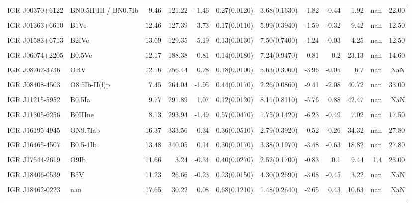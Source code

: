 \begin{longtable}{llrrrllrrrrr}
IGR J00370+6122 & BN0.5II-III / BN0.7Ib & 9.46 & 121.22 & -1.46 & 0.27(0.0120) & 3.68(0.1630) & -1.82 & -0.44 & 1.92 & nan & 22.00 \\ \\
IGR J01363+6610 & B1Ve & 12.46 & 127.39 & 3.73 & 0.17(0.0110) & 5.99(0.3940) & -1.59 & -0.32 & 9.42 & nan & 12.50 \\ \\
IGR J01583+6713 & B2IVe & 13.69 & 129.35 & 5.19 & 0.13(0.0130) & 7.50(0.7400) & -1.24 & -0.03 & 4.25 & nan & 12.50 \\ \\
IGR J06074+2205 & B0.5Ve & 12.17 & 188.38 & 0.81 & 0.14(0.0180) & 7.24(0.9470) & 0.81 & 0.2 & 23.13 & nan & 14.60 \\ \\
IGR J08262-3736 & OBV & 12.16 & 256.44 & 0.28 & 0.18(0.0100) & 5.63(0.3060) & -3.96 & -0.05 & 6.7 & nan & NaN \\ \\
IGR J08408-4503 & O8.5Ib-II(f)p & 7.45 & 264.04 & -1.95 & 0.44(0.0170) & 2.26(0.0860) & -9.41 & -2.08 & 40.72 & nan & 33.00 \\ \\
IGR J11215-5952 & B0.5Ia & 9.77 & 291.89 & 1.07 & 0.12(0.0120) & 8.11(0.8110) & -5.76 & 0.88 & 42.47 & nan & NaN \\ \\
IGR J11305-6256 & B0IIIne & 8.13 & 293.94 & -1.49 & 0.57(0.0470) & 1.75(0.1420) & -6.23 & -0.49 & 7.02 & nan & 17.50 \\ \\
IGR J16195-4945 & ON9.7Iab & 16.37 & 333.56 & 0.34 & 0.36(0.0510) & 2.79(0.3920) & -0.52 & -0.26 & 34.32 & nan & 27.80 \\ \\
IGR J16465-4507 & B0.5-1Ib & 13.48 & 340.05 & 0.14 & 0.30(0.0170) & 3.38(0.1970) & -3.48 & -0.63 & 18.82 & nan & 27.80 \\ \\
IGR J17544-2619 & O9Ib & 11.66 & 3.24 & -0.34 & 0.40(0.0270) & 2.52(0.1700) & -0.83 & 0.1 & 9.44 & 1.4 & 23.00 \\ \\
IGR J18406-0539 & B5V & 11.23 & 26.66 & -0.23 & 0.23(0.0150) & 4.30(0.2690) & -3.08 & -0.45 & 3.22 & nan & NaN \\ \\
IGR J18462-0223 & nan & 17.65 & 30.22 & 0.08 & 0.68(0.1210) & 1.48(0.2640) & -2.65 & 0.43 & 10.63 & nan & NaN \\ \\

\end{longtable}
